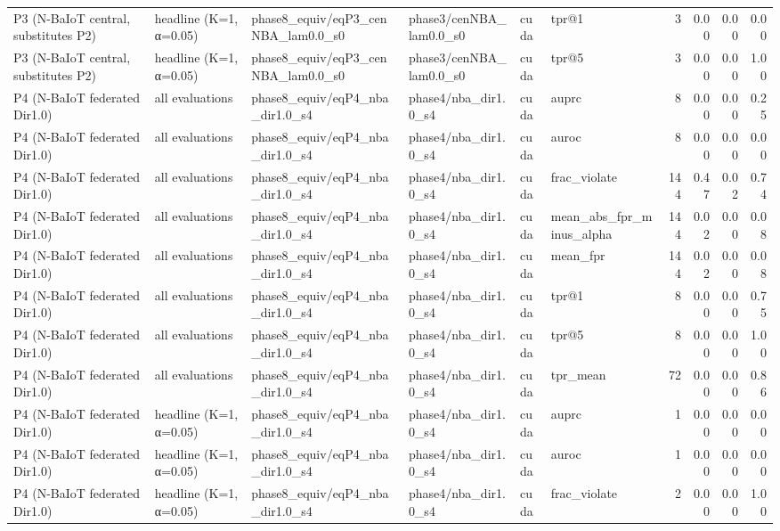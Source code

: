 \begin{tabular}{llllllrrrr}
P3 (N-BaIoT central, substitutes P2) & headline (K=1, α=0.05) & phase8\_equiv/eqP3\_cenNBA\_lam0.0\_s0 & phase3/cenNBA\_lam0.0\_s0 & cuda & tpr@1 & 3 & 0.00 & 0.00 & 0.00 \\
P3 (N-BaIoT central, substitutes P2) & headline (K=1, α=0.05) & phase8\_equiv/eqP3\_cenNBA\_lam0.0\_s0 & phase3/cenNBA\_lam0.0\_s0 & cuda & tpr@5 & 3 & 0.00 & 0.00 & 1.00 \\
P4 (N-BaIoT federated Dir1.0) & all evaluations & phase8\_equiv/eqP4\_nba\_dir1.0\_s4 & phase4/nba\_dir1.0\_s4 & cuda & auprc & 8 & 0.00 & 0.00 & 0.25 \\
P4 (N-BaIoT federated Dir1.0) & all evaluations & phase8\_equiv/eqP4\_nba\_dir1.0\_s4 & phase4/nba\_dir1.0\_s4 & cuda & auroc & 8 & 0.00 & 0.00 & 0.00 \\
P4 (N-BaIoT federated Dir1.0) & all evaluations & phase8\_equiv/eqP4\_nba\_dir1.0\_s4 & phase4/nba\_dir1.0\_s4 & cuda & frac\_violate & 144 & 0.47 & 0.02 & 0.74 \\
P4 (N-BaIoT federated Dir1.0) & all evaluations & phase8\_equiv/eqP4\_nba\_dir1.0\_s4 & phase4/nba\_dir1.0\_s4 & cuda & mean\_abs\_fpr\_minus\_alpha & 144 & 0.02 & 0.00 & 0.08 \\
P4 (N-BaIoT federated Dir1.0) & all evaluations & phase8\_equiv/eqP4\_nba\_dir1.0\_s4 & phase4/nba\_dir1.0\_s4 & cuda & mean\_fpr & 144 & 0.02 & 0.00 & 0.08 \\
P4 (N-BaIoT federated Dir1.0) & all evaluations & phase8\_equiv/eqP4\_nba\_dir1.0\_s4 & phase4/nba\_dir1.0\_s4 & cuda & tpr@1 & 8 & 0.00 & 0.00 & 0.75 \\
P4 (N-BaIoT federated Dir1.0) & all evaluations & phase8\_equiv/eqP4\_nba\_dir1.0\_s4 & phase4/nba\_dir1.0\_s4 & cuda & tpr@5 & 8 & 0.00 & 0.00 & 1.00 \\
P4 (N-BaIoT federated Dir1.0) & all evaluations & phase8\_equiv/eqP4\_nba\_dir1.0\_s4 & phase4/nba\_dir1.0\_s4 & cuda & tpr\_mean & 72 & 0.00 & 0.00 & 0.86 \\
P4 (N-BaIoT federated Dir1.0) & headline (K=1, α=0.05) & phase8\_equiv/eqP4\_nba\_dir1.0\_s4 & phase4/nba\_dir1.0\_s4 & cuda & auprc & 1 & 0.00 & 0.00 & 0.00 \\
P4 (N-BaIoT federated Dir1.0) & headline (K=1, α=0.05) & phase8\_equiv/eqP4\_nba\_dir1.0\_s4 & phase4/nba\_dir1.0\_s4 & cuda & auroc & 1 & 0.00 & 0.00 & 0.00 \\
P4 (N-BaIoT federated Dir1.0) & headline (K=1, α=0.05) & phase8\_equiv/eqP4\_nba\_dir1.0\_s4 & phase4/nba\_dir1.0\_s4 & cuda & frac\_violate & 2 & 0.00 & 0.00 & 1.00 \\

\end{tabular}
